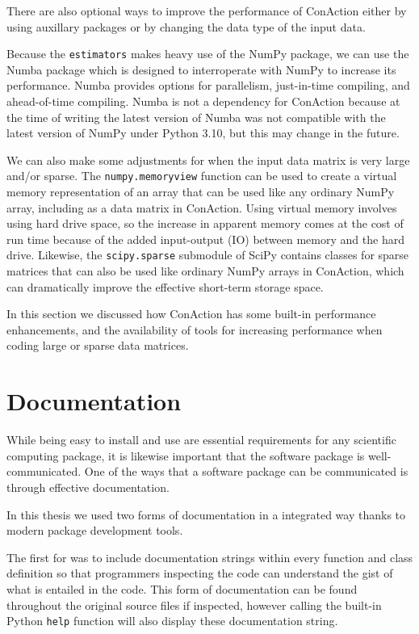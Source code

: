\documentclass[
  letterpaper,
  DIV=11,
  numbers=noendperiod]{scrreprt}
\begin{document}
There are also optional ways to improve the performance of ConAction
either by using auxillary packages or by changing the data type of the
input data.

Because the \texttt{estimators} makes heavy use of the NumPy package, we
can use the Numba package which is designed to interroperate with NumPy
to increase its performance. Numba provides options for parallelism,
just-in-time compiling, and ahead-of-time compiling. Numba is not a
dependency for ConAction because at the time of writing the latest
version of Numba was not compatible with the latest version of NumPy
under Python 3.10, but this may change in the future.

We can also make some adjustments for when the input data matrix is very
large and/or sparse. The \texttt{numpy.memoryview} function can be used
to create a virtual memory representation of an array that can be used
like any ordinary NumPy array, including as a data matrix in ConAction.
Using virtual memory involves using hard drive space, so the increase in
apparent memory comes at the cost of run time because of the added
input-output (IO) between memory and the hard drive. Likewise, the
\texttt{scipy.sparse} submodule of SciPy contains classes for sparse
matrices that can also be used like ordinary NumPy arrays in ConAction,
which can dramatically improve the effective short-term storage space.

In this section we discussed how ConAction has some built-in performance
enhancements, and the availability of tools for increasing performance
when coding large or sparse data matrices.

\section{Documentation}\label{documentation}

While being easy to install and use are essential requirements for any
scientific computing package, it is likewise important that the software
package is well-communicated. One of the ways that a software package
can be communicated is through effective documentation.

In this thesis we used two forms of documentation in a integrated way
thanks to modern package development tools.

The first for was to include documentation strings within every function
and class definition so that programmers inspecting the code can
understand the gist of what is entailed in the code. This form of
documentation can be found throughout the original source files if
inspected, however calling the built-in Python \texttt{help} function
will also display these documentation string.
\end{document}
